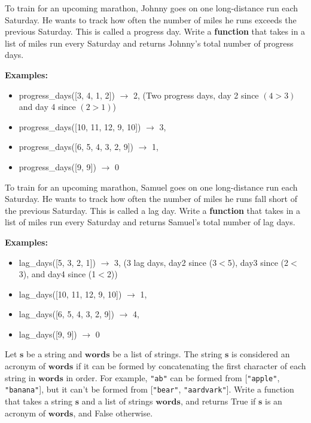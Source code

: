 	\item
		To train for an upcoming marathon, Johnny goes on one long-distance run each Saturday. 
		He wants to track how often the number of miles he runs exceeds the previous Saturday. 
		This is called a progress day. Write a \textbf{function} that takes in a list of miles 
		run every Saturday and returns Johnny's total number of progress days.

		\textbf{Examples:}		
		\begin{itemize}
			\item  progress\_days([3, 4, 1, 2]) $\rightarrow$ 2, 
				(Two progress days, day 2 since $(4>3)$ and day 4 since $(2>1)$)
			\item  progress\_days([10, 11, 12, 9, 10]) $\rightarrow$ 3, 
			\item  progress\_days([6, 5, 4, 3, 2, 9]) $\rightarrow$ 1, 
			\item  progress\_days([9, 9]) $\rightarrow$ 0
		\end{itemize}

	\item
		To train for an upcoming marathon, Samuel goes on one long-distance run each Saturday. 
		He wants to track how often the number of miles he runs fall short of the previous Saturday. 
		This is called a lag day. Write a \textbf{function} that takes in a list of miles 
		run every Saturday and returns Samuel's total number of lag days.

		\textbf{Examples:}		
		\begin{itemize}
			\item  lag\_days([5, 3, 2, 1]) $\rightarrow$ 3, 
				(3 lag days, day2 since (3$<$5), day3 since (2$<$3), and day4 since (1$<$2))
			\item  lag\_days([10, 11, 12, 9, 10]) $\rightarrow$ 1, 
			\item  lag\_days([6, 5, 4, 3, 2, 9]) $\rightarrow$ 4, 
			\item  lag\_days([9, 9]) $\rightarrow$ 0
		\end{itemize}

	\item 
		Let $\bm{s}$ be a string and $\bm{words}$ be a list of strings. The string $\bm{s}$ is 
		considered an acronym of $\bm{words}$ if it can be formed by concatenating the first 
		character of each string in $\bm{words}$ in order. For example, \texttt{"ab"} can be formed 
		from [\texttt{"apple"}, \texttt{"banana"}], but it can't be formed from [\texttt{"bear"}, 
		\texttt{"aardvark"}]. Write a function that takes a string $\bm{s}$ and a list of strings $
		\bm{words}$, and returns True if $\bm{s}$ is an acronym of $\bm{words}$, and False 
		otherwise.


